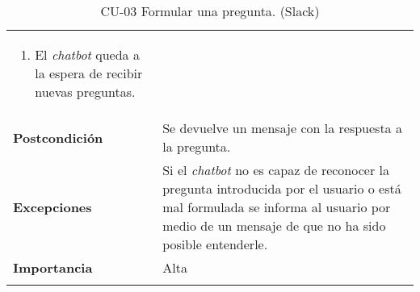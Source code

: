 \begin{longtable}[H]{@{}ll@{}}
\begin{minipage}[t]{0.71\columnwidth}
\begin{enumerate}
			\item
			El \textit{chatbot} queda a la espera de recibir nuevas preguntas.
		\end{enumerate}\strut
	\end{minipage}\tabularnewline
	\begin{minipage}[t]{0.23\columnwidth}\raggedright\strut
		\textbf{Postcondición}\strut
	\end{minipage} & \begin{minipage}[t]{0.71\columnwidth}\raggedright\strut
		Se devuelve un mensaje con la respuesta a la pregunta.\strut
	\end{minipage}\tabularnewline
	\begin{minipage}[t]{0.23\columnwidth}\raggedright\strut
		\textbf{Excepciones}\strut
	\end{minipage} & \begin{minipage}[t]{0.71\columnwidth}\raggedright\strut
		Si el \textit{chatbot} no es capaz de reconocer la pregunta introducida por el usuario o está mal formulada se informa al usuario por medio de un mensaje de que no ha sido posible entenderle.\strut
	\end{minipage}\tabularnewline
	\begin{minipage}[t]{0.23\columnwidth}\raggedright\strut
		\textbf{Importancia}\strut
	\end{minipage} & \begin{minipage}[t]{0.71\columnwidth}\raggedright\strut
		Alta\strut
	\end{minipage}\tabularnewline
	\bottomrule
	\caption{CU-03 Formular una pregunta. (Slack)}
\end{longtable}

\newpage


